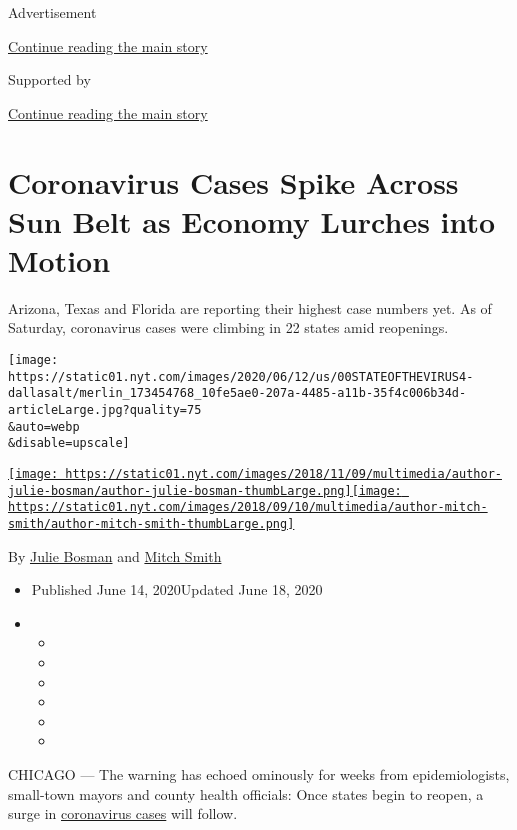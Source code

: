 Advertisement

\protect\hyperlink{after-top}{Continue reading the main story}

Supported by

\protect\hyperlink{after-sponsor}{Continue reading the main story}

\hypertarget{coronavirus-cases-spike-across-sun-belt-as-economy-lurches-into-motion}{%
\section{Coronavirus Cases Spike Across Sun Belt as Economy Lurches into
Motion}\label{coronavirus-cases-spike-across-sun-belt-as-economy-lurches-into-motion}}

Arizona, Texas and Florida are reporting their highest case numbers yet.
As of Saturday, coronavirus cases were climbing in 22 states amid
reopenings.

\texttt{[image: https://static01.nyt.com/images/2020/06/12/us/00STATEOFTHEVIRUS4-dallasalt/merlin\_173454768\_10fe5ae0-207a-4485-a11b-35f4c006b34d-articleLarge.jpg?quality=75\\\&auto=webp\\\&disable=upscale]}

\href{https://www.nytimes.com/by/julie-bosman}{\texttt{[image: https://static01.nyt.com/images/2018/11/09/multimedia/author-julie-bosman/author-julie-bosman-thumbLarge.png]}}\href{https://www.nytimes.com/by/mitch-smith}{\texttt{[image: https://static01.nyt.com/images/2018/09/10/multimedia/author-mitch-smith/author-mitch-smith-thumbLarge.png]}}

By \href{https://www.nytimes.com/by/julie-bosman}{Julie Bosman} and
\href{https://www.nytimes.com/by/mitch-smith}{Mitch Smith}

\begin{itemize}
\item
  Published June 14, 2020Updated June 18, 2020
\item
  \begin{itemize}
  \item
  \item
  \item
  \item
  \item
  \item
  \end{itemize}
\end{itemize}

CHICAGO --- The warning has echoed ominously for weeks from
epidemiologists, small-town mayors and county health officials: Once
states begin to reopen, a surge in
\href{https://www.nytimes.com/news-event/coronavirus}{coronavirus cases}
will follow.

